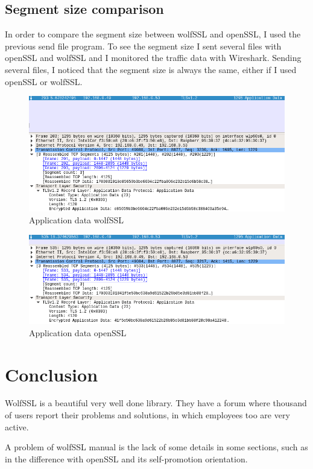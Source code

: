 \documentclass[a4paper,12pt]{article}
\begin{document}
\subsection{Segment size comparison}
In order to compare the segment size between wolfSSL and openSSL, I used the previous send file program. To see the segment size I sent several files with openSSL and wolfSSL and I monitored the traffic data with Wireshark. Sending several files, I noticed that the segment size is always the same, either if I used openSSL or wolfSSL.
\begin{figure}[H]
    \centering
    \includegraphics[scale=0.47]{./code/img/application_data_wolfSSL.png}
    \caption{Application data wolfSSL}
\end{figure}
\begin{figure}[H]
    \centering
    \includegraphics[scale=0.47]{./code/img/application_data_openSSL.png}
    \caption{Application data openSSL}
\end{figure}


\section{Conclusion}
WolfSSL is a beautiful very well done library. They have a forum where thousand of users report their problems and solutions, in which employees too are very active.

A problem of wolfSSL manual is the lack of some details in some sections, such as in the difference with openSSL and its self-promotion orientation.
\end{document}
